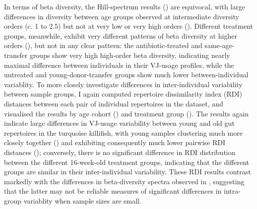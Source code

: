 In terms of beta diversity, the Hill-spectrum results () are equivocal, with large differences in diversity between age groups observed at intermediate diversity orders (c. 1 to 2.5) but not at very low or very high orders (). Different treatment groups, meanwhile, exhibit very different patterns of beta diversity at higher orders (), but not in any clear pattern: the antibiotic-treated and same-age-transfer groups show very high high-order beta diversity, indicating nearly maximal difference between individuals in their VJ-usage profiles, while the untreated and young-donor-transfer groups show much lower between-individual variablity. To more closely investigate differences in inter-individual variability between sample groups, I again computed repertoire dissimilarity index (RDI) distances between each pair of individual repertoires in the dataset, and visualised the results by age cohort () and treatment group (). The results again indicate large differences in VJ-usage variability between young and old gut repertoires in the turquoise killifish, with young samples clustering much more closely together () and exhibiting consequently much lower pairwise RDI distances (); conversely, there is no significant difference in RDI distribution between the different 16-week-old treatment groups, indicating that the different groups are similar in their inter-individual variability. These RDI results contrast markedly with the differences in beta-diversity spectra observed in , suggesting that the latter may not be reliable measures of significant differences in intra-group variablity when sample sizes are small.

